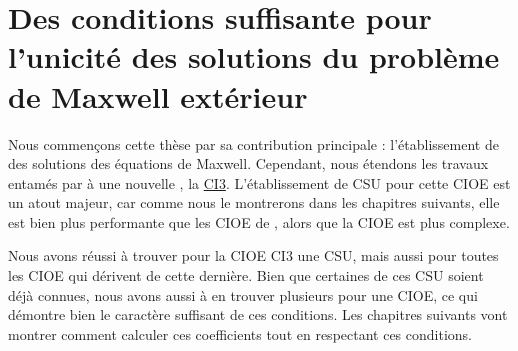 \chapter[Des CSU des solutions du problème de Maxwell extérieur]{Des conditions suffisante pour l'unicité des solutions du problème de Maxwell extérieur}
\label{sec:csu}
\minitoc
\newpage
{}
Nous commençons cette thèse par sa contribution principale : l'établissement de  des solutions des équations de Maxwell.
Cependant, nous étendons les travaux entamés par \cite{stupfel_sufficient_2011} à une nouvelle , la \hyperlink{ci3}{CI3}. L'établissement de CSU pour cette CIOE est un atout majeur, car comme nous le montrerons dans les chapitres suivants, elle est bien plus performante que les CIOE de \cite{stupfel_sufficient_2011}, alors que la CIOE est plus complexe.



Nous avons réussi à trouver pour la CIOE CI3 une CSU, mais aussi pour toutes les CIOE qui dérivent de cette dernière. Bien que certaines de ces CSU soient déjà connues, nous avons aussi à en trouver plusieurs pour une CIOE, ce qui démontre bien le caractère suffisant de ces conditions. Les chapitres suivants vont montrer comment calculer ces coefficients tout en respectant ces conditions.
